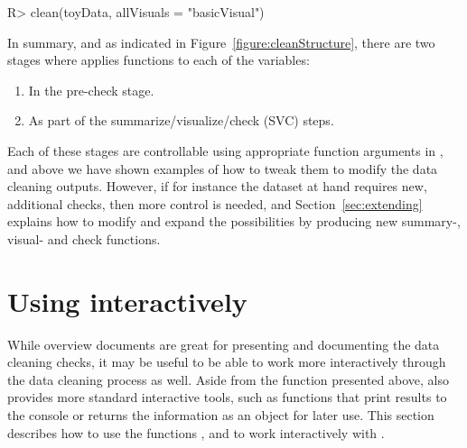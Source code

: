 \documentclass[article,shortnames]{jss}
\newcommand{\hl}[1]{\textcolor{magenta}{#1}}
\begin{document}
\begin{Schunk}
\begin{Sinput}
R> clean(toyData, allVisuals = "basicVisual")
\end{Sinput}
\end{Schunk}







In summary, and as indicated in Figure~\ref{figure:cleanStructure}, there are two stages
where  applies functions to each of the variables:
\begin{enumerate}
\item In the pre-check stage.
\item As part of the summarize/visualize/check (SVC) steps.
\end{enumerate}
Each of these stages are controllable using appropriate function
arguments in , and above we have shown examples of how to
tweak them to modify the data cleaning outputs. However, if for
instance the dataset at hand requires new, additional checks, then more control is needed, and
Section~\ref{sec:extending} explains how to modify and expand the
possibilities by producing new summary-, visual- and check functions.

\section[Using dataMaid interactively]{Using  interactively}
\label{sec:interactiveCleanR}

While overview documents are great for presenting and documenting the
data cleaning checks, it may be useful to be able to work more interactively
through the data cleaning process as well. Aside from the  function
presented above,  also provides more standard  interactive tools, such as
functions that print results to the console or returns the information
as an object for later use. This section describes how to use the
functions ,  and  to work
interactively with .
\end{document}

